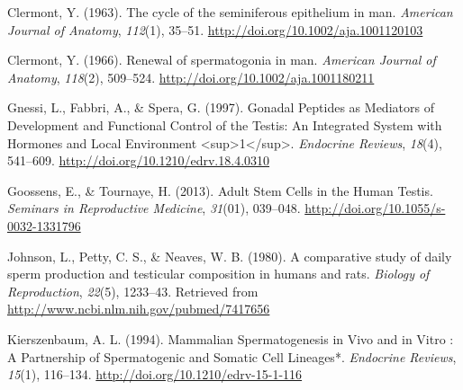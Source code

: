 \documentclass[12pt,twoside]{reedthesis}
\theoremstyle{definition}
\theoremstyle{definition}
\theoremstyle{remark}
\begin{document}
  \hypertarget{refs}{}
  \hypertarget{ref-Clermont1963}{}
  Clermont, Y. (1963). The cycle of the seminiferous epithelium in man.
  \emph{American Journal of Anatomy}, \emph{112}(1), 35--51.
  \url{http://doi.org/10.1002/aja.1001120103}
  
  \hypertarget{ref-Clermont1966}{}
  Clermont, Y. (1966). Renewal of spermatogonia in man. \emph{American
  Journal of Anatomy}, \emph{118}(2), 509--524.
  \url{http://doi.org/10.1002/aja.1001180211}
  
  \hypertarget{ref-Gnessi1997}{}
  Gnessi, L., Fabbri, A., \& Spera, G. (1997). Gonadal Peptides as
  Mediators of Development and Functional Control of the Testis: An
  Integrated System with Hormones and Local Environment
  \textless{}sup\textgreater{}1\textless{}/sup\textgreater{}.
  \emph{Endocrine Reviews}, \emph{18}(4), 541--609.
  \url{http://doi.org/10.1210/edrv.18.4.0310}
  
  \hypertarget{ref-Goossens2013}{}
  Goossens, E., \& Tournaye, H. (2013). Adult Stem Cells in the Human
  Testis. \emph{Seminars in Reproductive Medicine}, \emph{31}(01),
  039--048. \url{http://doi.org/10.1055/s-0032-1331796}
  
  \hypertarget{ref-Johnson1980}{}
  Johnson, L., Petty, C. S., \& Neaves, W. B. (1980). A comparative study
  of daily sperm production and testicular composition in humans and rats.
  \emph{Biology of Reproduction}, \emph{22}(5), 1233--43. Retrieved from
  \url{http://www.ncbi.nlm.nih.gov/pubmed/7417656}
  
  \hypertarget{ref-KIERSZENBAUM1994}{}
  Kierszenbaum, A. L. (1994). Mammalian Spermatogenesis in Vivo and in
  Vitro : A Partnership of Spermatogenic and Somatic Cell Lineages*.
  \emph{Endocrine Reviews}, \emph{15}(1), 116--134.
  \url{http://doi.org/10.1210/edrv-15-1-116}


\end{document}

